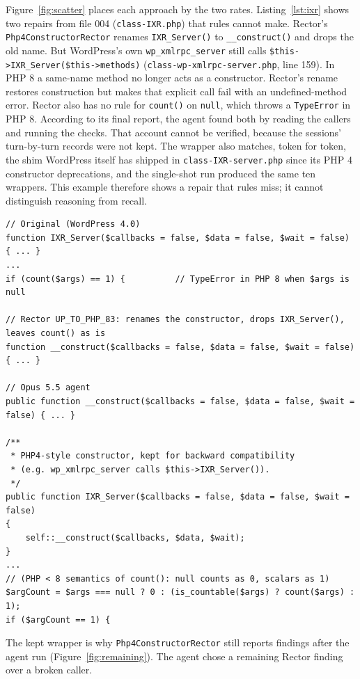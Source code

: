 \documentclass[11pt]{article}
\newcommand{\code}[1]{\texttt{#1}}
\begin{document}
Figure~\ref{fig:scatter} places each approach by the two rates.
Listing~\ref{lst:ixr} shows two repairs from file 004 (\code{class-IXR.php}) that rules cannot make.
Rector's \code{Php4ConstructorRector} renames \code{IXR\_Server()} to \code{\_\_construct()} and drops the old name.
But WordPress's own \code{wp\_xmlrpc\_server} still calls \code{\$this->IXR\_Server(\$this->methods)} (\code{class-wp-xmlrpc-server.php}, line 159).
In PHP 8 a same-name method no longer acts as a constructor.
Rector's rename restores construction but makes that explicit call fail with an undefined-method error.
Rector also has no rule for \code{count()} on \code{null}, which throws a \code{TypeError} in PHP 8.
According to its final report, the agent found both by reading the callers and running the checks.
That account cannot be verified, because the sessions' turn-by-turn records were not kept.
The wrapper also matches, token for token, the shim WordPress itself has shipped in \code{class-IXR-server.php} since its PHP 4 constructor deprecations, and the single-shot run produced the same ten wrappers.
This example therefore shows a repair that rules miss; it cannot distinguish reasoning from recall.

\begin{lstlisting}[float=t,caption={File 004: original, Rector's rewrite, and the Opus 5.5 agent's output (excerpts).},label={lst:ixr}]
// Original (WordPress 4.0)
function IXR_Server($callbacks = false, $data = false, $wait = false) { ... }
...
if (count($args) == 1) {          // TypeError in PHP 8 when $args is null

// Rector UP_TO_PHP_83: renames the constructor, drops IXR_Server(), leaves count() as is
function __construct($callbacks = false, $data = false, $wait = false) { ... }

// Opus 5.5 agent
public function __construct($callbacks = false, $data = false, $wait = false) { ... }

/**
 * PHP4-style constructor, kept for backward compatibility
 * (e.g. wp_xmlrpc_server calls $this->IXR_Server()).
 */
public function IXR_Server($callbacks = false, $data = false, $wait = false)
{
    self::__construct($callbacks, $data, $wait);
}
...
// (PHP < 8 semantics of count(): null counts as 0, scalars as 1)
$argCount = $args === null ? 0 : (is_countable($args) ? count($args) : 1);
if ($argCount == 1) {
\end{lstlisting}

The kept wrapper is why \code{Php4ConstructorRector} still reports findings after the agent run (Figure~\ref{fig:remaining}).
The agent chose a remaining Rector finding over a broken caller.
\end{document}
